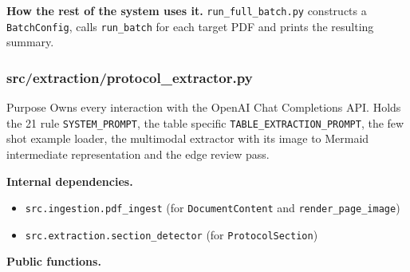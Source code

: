 \documentclass{article}
\begin{document}
\textbf{How the rest of the system uses it.} \texttt{run\_full\_batch.py}
constructs a \texttt{BatchConfig}, calls \texttt{run\_batch} for each
target PDF and prints the resulting summary.

\subsubsection{src/extraction/protocol\_extractor.py}

\begin{codeconceptbox}{Purpose}
Owns every interaction with the OpenAI Chat Completions API. Holds the
21 rule \texttt{SYSTEM\_PROMPT}, the table specific
\texttt{TABLE\_EXTRACTION\_PROMPT}, the few shot example loader, the
multimodal extractor with its image to Mermaid intermediate
representation and the edge review pass.
\end{codeconceptbox}

\textbf{Internal dependencies.}
\begin{itemize}[leftmargin=2em, nosep, label={--}]
\item \texttt{src.ingestion.pdf\_ingest}
  (for \texttt{DocumentContent} and \texttt{render\_page\_image})
\item \texttt{src.extraction.section\_detector}
  (for \texttt{ProtocolSection})
\end{itemize}

\textbf{Public functions.}
\end{document}
